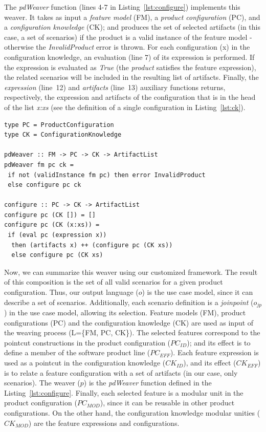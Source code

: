 \documentclass{acm_proc_article-sp}
\begin{document}
The \emph{pdWeaver} function (lines 4-7 in
Listing~\ref{lst:configure}) implements this weaver. It
takes as input a \emph{feature model} (FM), a \emph{product configuration} (PC),
and a \emph{configuration knowledge} (CK); and produces the set of
selected artifacts (in this case, a set of scenarios) if the product is a valid instance 
of the feature model - otherwise the \emph{InvalidProduct} error is thrown. For each
configuration (x) in the configuration knowledge, an evaluation (line 7) of its
expression is performed. If the expression is evaluated as
\emph{True} (the \emph{product} satisfies the feature expression), the
related scenarios will be included in the resulting list of artifacts. Finally, the 
\emph{expression} (line~12) and \emph{artifacts} (line~13) auxiliary functions returns, respectively, the expression 
and artifacts of the configuration that is in the head of the list \emph{x:xs} (see the definition of a single
configuration in Listing~\ref{lst:ck}).

\begin{lstlisting}[belowskip=20pt,frame=tb,caption={The \emph{configure weaver} function},label=lst:configure]
type PC = ProductConfiguration
type CK = ConfigurationKnowledge

pdWeaver :: FM -> PC -> CK -> ArtifactList
pdWeaver fm pc ck = 
 if not (validInstance fm pc) then error InvalidProduct
 else configure pc ck

configure :: PC -> CK -> ArtifactList
configure pc (CK []) = []
configure pc (CK (x:xs)) =
 if (eval pc (expression x))
  then (artifacts x) ++ (configure pc (CK xs))
  else configure pc (CK xs)
\end{lstlisting}

Now, we can summarize this weaver using our customized framework. The
result of this composition is the set of all valid scenarios for a
given product configuration. Thus, our output language ($o$) is the
use case model, since it can describe a set of scenarios.
Additionally, each scenario definition is a \emph{joinpoint}
($o_{jp}$) in the use case model, allowing its selection. Feature models (FM),
product configurations (PC) and the configuration knowledge (CK) are used
as input of the weaving process (L=\{FM, PC, CK\}). 
The selected features correspond to the pointcut constructions in the 
product configuration ($PC_{ID}$); and
its effect is to define a member of the software product
line ($PC_{EFF}$). Each feature expression is used as a pointcut in
the configuration knowledge ($CK_{ID}$), and its effect ($CK_{EFF}$) is to relate
a feature configuration with a set of artifacts (in our case, only
scenarios). The weaver ($p$) is the \emph{pdWeaver}
function defined in the Listing~\ref{lst:configure}. Finally, each
selected feature is a modular unit in the product configuration
($PC_{MOD}$), since it can be reusable in other product
configurations. On the other hand, the configuration knowledge
modular unities ($CK_{MOD}$) are the feature expressions and
configurations.
\end{document}
